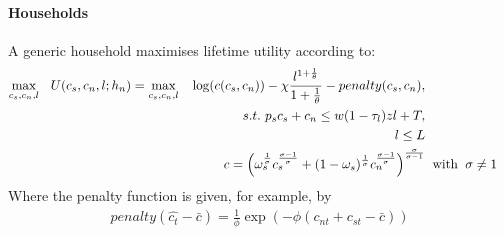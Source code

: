 \documentclass[12pt]{article}
\renewcommand{\hat}{\widehat}
\begin{document}
\paragraph{Households} A generic household maximises lifetime utility according to:
\begin{align}
\underset{c_{s},c_{n}, l}{\max} \ \hspace{2mm} U(c_s, c_n, l; h_n)= \underset{c_{s},c_{n}, l}{\max} \ \hspace{2mm} \log(c(c_s,c_n))-\chi\frac{l^{1+\frac{1}{\theta}}}{1+\frac{1}{\theta}}  -penalty(c_s, c_n),
\\
s.t. \  p_{s}c_{s}+c_{n}\leq w(1-\tau_l)zl+T,\\
l\leq L \\
c =
\left(\omega_s^{\frac{1}{\sigma}}c_{s}^{\frac{\sigma-1}{\sigma}}+(1-\omega_s)^{\frac{1}{\sigma}}c_{n}^{\frac{\sigma-1}{\sigma}}\right)^{\frac{\sigma}{\sigma-1}}& \hspace{2mm} \text{with} \hspace*{2mm} \sigma \neq 1
\end{align}
Where the penalty function is given, for example, by
\begin{align*}
penalty(\hat{c_t}-\bar{c})=\frac{1}{\phi}\exp(-\phi(c_{nt}+c_{st}-\bar{c}))\\
\end{align*}
\clearpage

\end{document}
